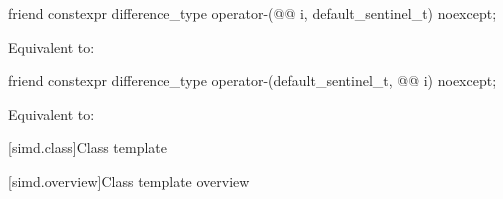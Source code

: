 \begin{itemdecl}
friend constexpr difference_type operator-(@@ i, default_sentinel_t) noexcept;
\end{itemdecl}

\begin{itemdescr}
\pnum
\effects
Equivalent to: 
\end{itemdescr}


\begin{itemdecl}
friend constexpr difference_type operator-(default_sentinel_t, @@ i) noexcept;
\end{itemdecl}

\begin{itemdescr}
\pnum
\effects
Equivalent to: 
\end{itemdescr}

[simd.class]{Class template }

[simd.overview]{Class template  overview}

